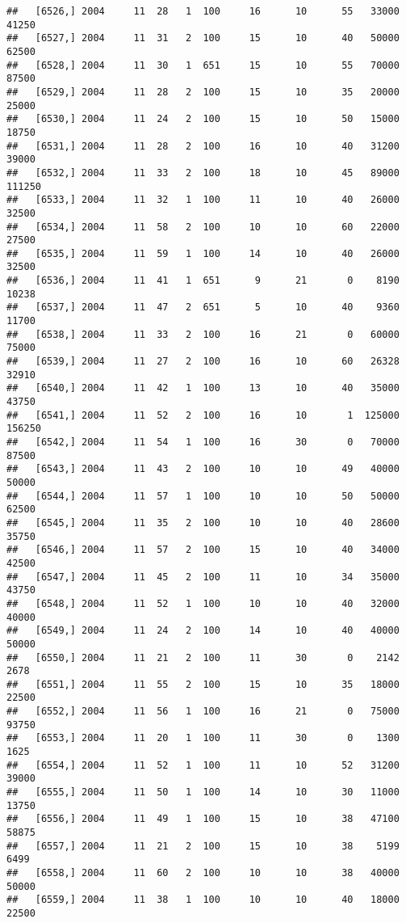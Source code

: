 \documentclass{article}\usepackage[]{graphicx}\usepackage[]{color}
\makeatletter
\newenvironment{kframe}{%
 \def\at@end@of@kframe{}%
 \ifinner\ifhmode%
  \def\at@end@of@kframe{\end{minipage}}%
  \begin{minipage}{\columnwidth}%
 \fi\fi%
 \def\FrameCommand##1{\hskip\@totalleftmargin \hskip-\fboxsep
 \colorbox{shadecolor}{##1}\hskip-\fboxsep
     \hskip-\linewidth \hskip-\@totalleftmargin \hskip\columnwidth}%
 \MakeFramed {\advance\hsize-\width
   \@totalleftmargin\z@ \linewidth\hsize
   \@setminipage}}%
 {\par\unskip\endMakeFramed%
 \at@end@of@kframe}
\newenvironment{knitrout}{}{} %
\makeatother
\begin{document}
\begin{knitrout}
\begin{kframe}
\begin{verbatim}
##   [6526,] 2004     11  28   1  100     16      10      55   33000   41250
##   [6527,] 2004     11  31   2  100     15      10      40   50000   62500
##   [6528,] 2004     11  30   1  651     15      10      55   70000   87500
##   [6529,] 2004     11  28   2  100     15      10      35   20000   25000
##   [6530,] 2004     11  24   2  100     15      10      50   15000   18750
##   [6531,] 2004     11  28   2  100     16      10      40   31200   39000
##   [6532,] 2004     11  33   2  100     18      10      45   89000  111250
##   [6533,] 2004     11  32   1  100     11      10      40   26000   32500
##   [6534,] 2004     11  58   2  100     10      10      60   22000   27500
##   [6535,] 2004     11  59   1  100     14      10      40   26000   32500
##   [6536,] 2004     11  41   1  651      9      21       0    8190   10238
##   [6537,] 2004     11  47   2  651      5      10      40    9360   11700
##   [6538,] 2004     11  33   2  100     16      21       0   60000   75000
##   [6539,] 2004     11  27   2  100     16      10      60   26328   32910
##   [6540,] 2004     11  42   1  100     13      10      40   35000   43750
##   [6541,] 2004     11  52   2  100     16      10       1  125000  156250
##   [6542,] 2004     11  54   1  100     16      30       0   70000   87500
##   [6543,] 2004     11  43   2  100     10      10      49   40000   50000
##   [6544,] 2004     11  57   1  100     10      10      50   50000   62500
##   [6545,] 2004     11  35   2  100     10      10      40   28600   35750
##   [6546,] 2004     11  57   2  100     15      10      40   34000   42500
##   [6547,] 2004     11  45   2  100     11      10      34   35000   43750
##   [6548,] 2004     11  52   1  100     10      10      40   32000   40000
##   [6549,] 2004     11  24   2  100     14      10      40   40000   50000
##   [6550,] 2004     11  21   2  100     11      30       0    2142    2678
##   [6551,] 2004     11  55   2  100     15      10      35   18000   22500
##   [6552,] 2004     11  56   1  100     16      21       0   75000   93750
##   [6553,] 2004     11  20   1  100     11      30       0    1300    1625
##   [6554,] 2004     11  52   1  100     11      10      52   31200   39000
##   [6555,] 2004     11  50   1  100     14      10      30   11000   13750
##   [6556,] 2004     11  49   1  100     15      10      38   47100   58875
##   [6557,] 2004     11  21   2  100     15      10      38    5199    6499
##   [6558,] 2004     11  60   2  100     10      10      38   40000   50000
##   [6559,] 2004     11  38   1  100     10      10      40   18000   22500

\end{verbatim}
\end{kframe}
\end{knitrout}
\end{document}
